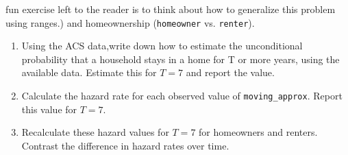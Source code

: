 \documentclass[11pt, a4paper]{article}
\begin{document}
\begin{enumerate}
    fun exercise left to the reader is to think about how to
    generalize this problem using ranges.) and homeownership
  (\texttt{homeowner} vs. \texttt{renter}).
    \begin{enumerate}
    \item Using the ACS data,write down how to estimate the unconditional probability that a household stays in a home for T or more years, using the available data. Estimate this for $T=7$ and report the value.
    \item Calculate the hazard rate for each observed value of
      \texttt{moving\_approx}. Report this value for $T=7$.
    \item Recalculate these hazard values for $T=7$ for homeowners and
      renters. Contrast the difference in hazard rates over time.
    \end{enumerate}
   
\end{enumerate}
\end{document}
